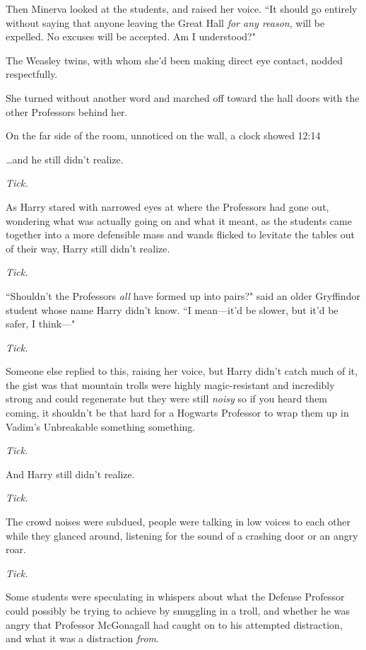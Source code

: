 Then Minerva looked at the students, and raised her voice. ``It should go entirely without saying that anyone leaving the Great Hall \emph{for any reason}, will be expelled. No excuses will be accepted. Am I understood?"

The Weasley twins, with whom she'd been making direct eye contact, nodded respectfully.

She turned without another word and marched off toward the hall doors with the other Professors behind her.

On the far side of the room, unnoticed on the wall, a clock showed 12:14\pm

\later

{\ldots}and he still didn't realize.

\emph{Tick.}

As Harry stared with narrowed eyes at where the Professors had gone out, wondering what was actually going on and what it meant, as the students came together into a more defensible mass and wands flicked to levitate the tables out of their way, Harry still didn't realize.

\emph{Tick.}

``Shouldn't the Professors \emph{all} have formed up into pairs?" said an older Gryffindor student whose name Harry didn't know. ``I mean—it'd be slower, but it'd be safer, I think—"

\emph{Tick.}

Someone else replied to this, raising her voice, but Harry didn't catch much of it, the gist was that mountain trolls were highly magic-resistant and incredibly strong and could regenerate but they were still \emph{noisy} so if you heard them coming, it shouldn't be that hard for a Hogwarts Professor to wrap them up in Vadim's Unbreakable something something.

\emph{Tick.}

And Harry still didn't realize.

\emph{Tick.}

The crowd noises were subdued, people were talking in low voices to each other while they glanced around, listening for the sound of a crashing door or an angry roar.

\emph{Tick.}

Some students were speculating in whispers about what the Defense Professor could possibly be trying to achieve by smuggling in a troll, and whether he was angry that Professor McGonagall had caught on to his attempted distraction, and what it was a distraction \emph{from}.

